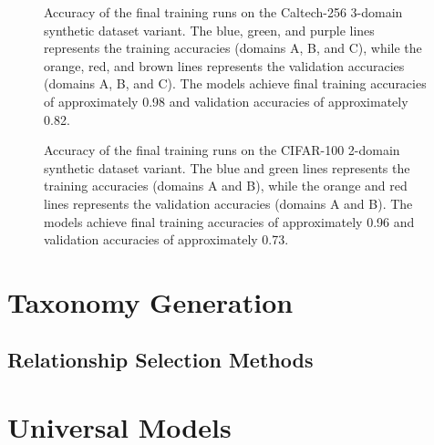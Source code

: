 \begin{figure}[ht]
      \centering
      \scalebox{0.6}{}
      \caption{Accuracy of the final training runs on the Caltech-256 3-domain synthetic dataset variant.
            The blue, green, and purple lines represents the training accuracies (domains A, B, and C),
            while the orange, red, and brown lines represents the validation accuracies (domains A, B, and C).
            The models achieve final training accuracies of approximately 0.98 and validation accuracies of approximately 0.82.}
      \label{fig:caltech256_3domain_accuracy}
\end{figure}

\begin{figure}[ht]
      \centering
      \scalebox{0.6}{}
      \caption{Accuracy of the final training runs on the CIFAR-100 2-domain synthetic dataset variant.
            The blue and green lines represents the training accuracies (domains A and B),
            while the orange and red lines represents the validation accuracies (domains A and B).
            The models achieve final training accuracies of approximately 0.96 and validation accuracies of approximately 0.73.}
      \label{fig:cifar100_2domain_accuracy}
\end{figure}

\begin{center}
      
\end{center}


\section{Taxonomy Generation}

\subsection{Relationship Selection Methods} \label{sec:relationship_selection}



\section{Universal Models}

